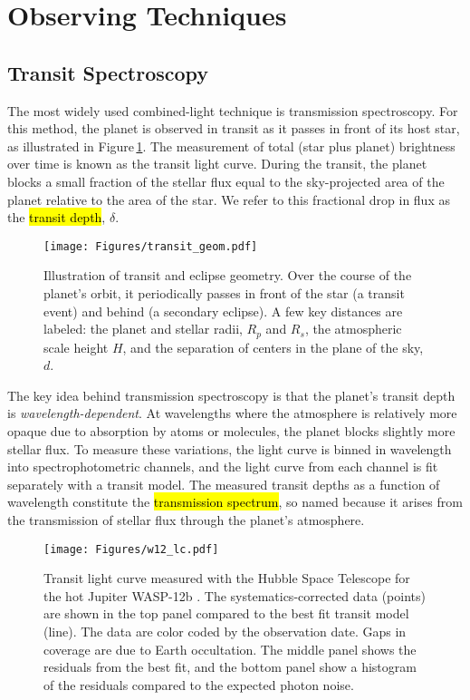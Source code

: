 \documentclass[graybox,natbib,nosecnum]{svmult}
\newcommand{\hbindex}[1]{\hl{#1}\index{#1}}  %
\begin{document}
\section{Observing Techniques} 

\subsection{Transit Spectroscopy}
The most widely used combined-light technique is transmission spectroscopy. For this method, the planet is observed in transit as it passes in front of its host star, as illustrated in Figure\,\ref{fig:geom}.  The measurement of total (star plus planet) brightness over time is known as the transit light curve.  During the transit, the planet blocks a small fraction of the stellar flux equal to the sky-projected area of the planet relative to the area of the star. We refer to this fractional drop in flux as the \hbindex{transit depth}, $\delta$. 


\begin{figure}
\begin{centering}
\texttt{[image: Figures/transit\_geom.pdf]}
\caption{Illustration of transit and eclipse geometry. Over the course of the planet's orbit, it periodically passes in front of the star (a transit event) and behind (a secondary eclipse). A few key distances are labeled: the planet and stellar radii, $R_p$ and $R_s$, the atmospheric scale height $H$, and the separation of centers in the plane of the sky, $d$.}
\label{fig:geom}       
\end{centering}
\end{figure}

The key idea behind transmission spectroscopy is that the planet's transit depth is \emph{wavelength-dependent}.  At wavelengths where the atmosphere is relatively more opaque due to absorption by atoms or molecules, the planet blocks slightly more stellar flux.  To measure these variations, the light curve is binned in wavelength into spectrophotometric channels, and the light curve from each channel is fit separately with a transit model.  The measured transit depths as a function of wavelength constitute the \hbindex{transmission spectrum}, so named because it arises from the transmission of stellar flux through the planet's atmosphere.
 
\begin{figure}
\begin{centering}
\texttt{[image: Figures/w12\_lc.pdf]}
\caption{Transit light curve measured with the Hubble Space Telescope for the hot Jupiter WASP-12b \citep{kreidberg14b}. The systematics-corrected data (points) are shown in the top panel compared to the best fit transit model (line). The data are color coded by the observation date. Gaps in coverage are due to Earth occultation. The middle panel shows the residuals from the best fit, and the bottom panel show a histogram of the residuals compared to the expected photon noise.}
\label{fig:lc}       
\end{centering}
\end{figure}
\end{document}
